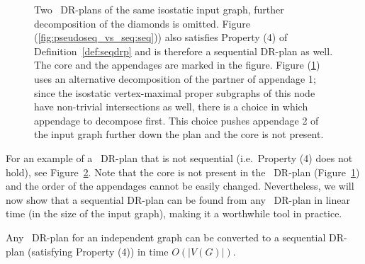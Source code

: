 \begin{figure}
\begin{subfigure}{0.48\linewidth}
        \caption{}\label{fig:pseudoseq_vs_seq:pseudoseq}
    \end{subfigure}%

    \caption{Two \pseudosequential\ DR-plans of the same isostatic input graph, further decomposition of the diamonds is omitted. Figure (\ref{fig:pseudoseq_vs_seq:seq})) also satisfies Property (4) of Definition~\ref{def:seqdrp} and is therefore a sequential DR-plan as well. The core and the appendages are marked in the figure. Figure (\ref{fig:pseudoseq_vs_seq:pseudoseq}) uses an alternative decomposition of the partner of appendage 1; since the isostatic vertex-maximal proper subgraphs of this node have non-trivial intersections as well, there is a choice in which appendage to decompose first. This choice pushes appendage 2 of the input graph further down the plan and the core is not present.}
    \label{fig:pseudoseq_vs_seq}
\end{figure}

For an example of a \pseudosequential\ DR-plan that is not sequential (i.e.\ Property (4) does not hold), see Figure~\ref{fig:pseudoseq_vs_seq}. Note that the core is not present in the \pseudosequential\ DR-plan (Figure~\ref{fig:pseudoseq_vs_seq:pseudoseq}) and the order of the appendages cannot be easily changed.
Nevertheless, we will now
show that a sequential DR-plan can be found from any \pseudosequential\ DR-plan in linear time (in the size of the input graph), making it a worthwhile tool in practice.

\begin{lemma}
    Any \pseudosequential\ DR-plan for an independent graph can be converted to a sequential DR-plan (satisfying Property (4)) in time $O(|V(G)|)$.
\end{lemma}

